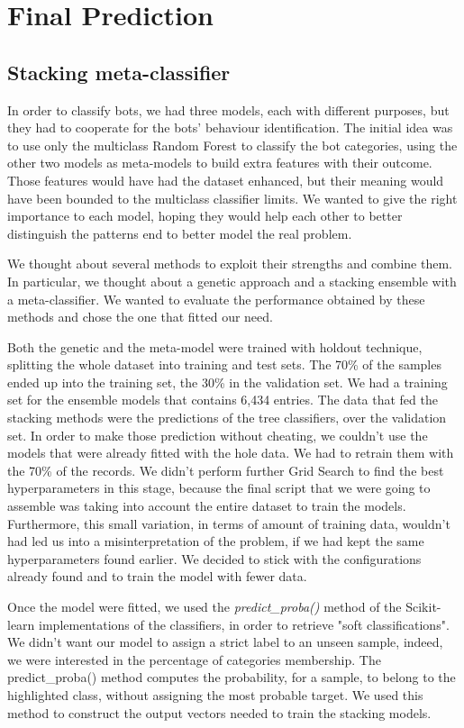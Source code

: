 \chapter{Final Prediction}
\label{capitolo6}
\thispagestyle{empty}
\section{Stacking meta-classifier}
In order to classify bots, we had three models, each with different purposes, but they had to cooperate for the bots' behaviour identification.
The initial idea was to use only the multiclass Random Forest to classify the bot categories, using the other two models as meta-models to build extra features with their outcome.
Those features would have had the dataset enhanced, but their meaning would have been bounded to the multiclass classifier limits.
We wanted to give the right importance to each model, hoping they would help each other to better distinguish the patterns end to better model the real problem.

We thought about several methods to exploit their strengths and combine them. In particular, we thought about a genetic approach and a stacking ensemble with a meta-classifier. 
We wanted to evaluate the performance obtained by these methods and chose the one that fitted our need.

Both the genetic and the meta-model were trained with holdout technique, splitting the whole dataset into training and test sets. The 70\% of the samples ended up into the training set, the 30\% in the validation set.
We had a training set for the ensemble models that contains 6,434 entries.
The data that fed the stacking methods were the predictions of the tree classifiers, over the validation set.
In order to make those prediction without cheating, we couldn't use the models that were already fitted with the hole data. We had to retrain them with the 70\% of the records. 
We didn't perform further Grid Search to find the best hyperparameters in this stage, because the final script that we were going to assemble was taking into account the entire dataset to train the models. Furthermore, this small variation, in terms of amount of training data, wouldn't had led us into a misinterpretation of the problem, if we had kept the same hyperparameters found earlier.
We decided to stick with the configurations already found and to train the model with fewer data.

Once the model were fitted, we used the \textit{predict\_proba()} method of the Scikit-learn implementations of the classifiers, in order to retrieve "soft classifications".
We didn't want our model to assign a strict label to an unseen sample, indeed, we were interested in the percentage of categories membership.
The predict\_proba() method computes the probability, for a sample, to belong to the highlighted class, without assigning the most probable target.
We used this method to construct the output vectors needed to train the stacking models.

